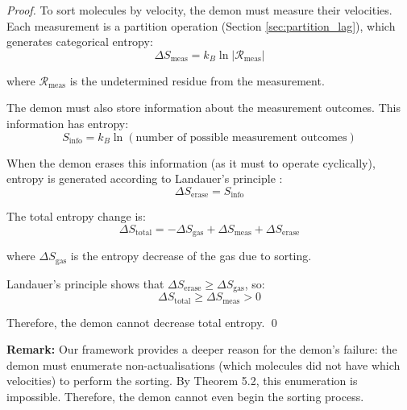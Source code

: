 \documentclass[twocolumn,10pt]{article}
\theoremstyle{definition}
\theoremstyle{remark}
\begin{document}
\begin{proof}
To sort molecules by velocity, the demon must measure their velocities. Each measurement is a partition operation (Section \ref{sec:partition_lag}), which generates categorical entropy:
$$
\Delta S_{\text{meas}} = k_B \ln|\mathcal{R}_{\text{meas}}|
$$

where $\mathcal{R}_{\text{meas}}$ is the undetermined residue from the measurement.

The demon must also store information about the measurement outcomes. This information has entropy:
$$
S_{\text{info}} = k_B \ln(\text{number of possible measurement outcomes})
$$

When the demon erases this information (as it must to operate cyclically), entropy is generated according to Landauer's principle \cite{landauer1961}:
$$
\Delta S_{\text{erase}} = S_{\text{info}}
$$

The total entropy change is:
$$
\Delta S_{\text{total}} = -\Delta S_{\text{gas}} + \Delta S_{\text{meas}} + \Delta S_{\text{erase}}
$$

where $\Delta S_{\text{gas}}$ is the entropy decrease of the gas due to sorting.

Landauer's principle shows that $\Delta S_{\text{erase}} \geq \Delta S_{\text{gas}}$, so:
$$
\Delta S_{\text{total}} \geq \Delta S_{\text{meas}} > 0
$$

Therefore, the demon cannot decrease total entropy. \qed
\end{proof}

\textbf{Remark:} Our framework provides a deeper reason for the demon's failure: the demon must enumerate non-actualisations (which molecules did not have which velocities) to perform the sorting. By Theorem 5.2, this enumeration is impossible. Therefore, the demon cannot even begin the sorting process.
\end{document}

